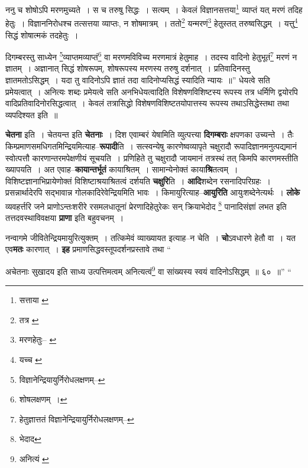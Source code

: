 \documentclass[article,12pt,a4paper]{memoir}
\begin{document}
	ननु च शोषोऽपि मरणमुच्यते । स च तरुषु सिद्धः । सत्यम् । केवलं विज्ञानसत्तया\footnote{सत्ताया \cite{dp-msA}} व्याप्तं यत् मरणं तदिह हेतुः । विज्ञाननिरोधश्च तत्सत्तया व्याप्तः, न शोषमात्रम् । ततो\footnote{तत्र \cite{dp-msA}} यन्मरणं\footnote{मरणहेतुः--\cite{dp-msA} \cite{dp-msB} \cite{dp-edP} \cite{dp-edH} \cite{dp-edN}} हेतुस्तत् तरुष्वसिद्धम् । यत्तु\footnote{यच्च \cite{dp-msD}} सिद्धं शोषात्मकं तदहेतुः । 
	  
	दिगम्बरस्तु साध्येन \footnote{विज्ञानेन्द्रियायुर्निरोधलक्षणम्--\cite{dp-msD-n}}व्याप्तमव्याप्तं\footnote{शोषलक्षणम् ।} वा मरणमविविच्य मरणमात्रं हेतुमाह । तदस्य वादिनो हेतुभूतं\footnote{हेतुज्ञात्ततं \cite{dp-msA} विज्ञानेन्द्रियायुर्निरोधलक्षणम्--\cite{dp-msD-n}} मरणं न ज्ञातम् । अज्ञानात् सिद्धं शोषरूपम्, शोषरूपस्य मरणस्य तरुषु दर्शनात् । प्रतिवादिनस्तु ज्ञातमतोऽसिद्धम् । यदा तु वादिनोऽपि ज्ञातं तदा वादिनोप्यसिद्धं स्यादिति न्यायः ॥” धेयत्वे सति प्रमेयत्वात् । अनित्यः शब्दः प्रमेयत्वे सति अनभिधेयत्वादिति विशेषणविशिष्टस्य रूपस्य तत्र धर्मिणि द्वयोरपि वादिप्रतिवादिनोरसिद्धत्वात् । केवलं तत्रासिद्धो विशेषणविशिष्टतयोपात्तस्य रूपस्य तथाऽसिद्धेस्तथा तथा व्यपदिश्यत इति ॥
	\pend
      

	  \pstart \textbf{चेतना} इति । चेतयन्त इति \textbf{चेतनाः} । दिश एवाम्बरं येषामिति व्युत्पत्त्या \textbf{दिगम्बराः} क्षपणका उच्यन्ते । तैः किम्प्रमाणसमधिगतमिन्द्रियमित्याह--\textbf{रूपादी}ति । सत्स्वन्येषु कारणेष्वव्यापृते चक्षुरादौ रूपादिज्ञानमनुत्पद्यमानं स्वोत्पत्तौ कारणा\leavevmode{}न्तरमपेक्षणीयं सूचयति । प्रणिहिते तु चक्षुरादौ जायमानं तत्रस्थं तत् किमपि कारणमस्तीति ख्यापयति । अत एवाह--\textbf{कायान्तर्भूतं} कायाश्रितम् । सामान्येनोक्तं काया\textbf{श्रि}तत्वम् । विशिष्टज्ञानाभिप्रायेणोक्तं विशिष्टाश्रयाश्रितत्वं दर्शयति \textbf{चक्षुरि}ति । \textbf{आदि}शब्देन रसनादिपरिग्रहः । प्रसन्नार्थादेरपि सद्भावान्न गोलकादिरेवेन्द्रियमिति भावः । किमायुरित्याह--\textbf{आयुरिति} आयुःशब्देनेत्यर्थः । \textbf{लोके} व्यवहर्त्तरि जने प्राणोऽन्तःशरीरे रसमलधातूनां प्रेरणादिहेतुरेकः सन् क्रियाभेदोद \footnote{भेदाद} पानादिसंज्ञां लभत इति तत्तदवस्थाविवक्षया \textbf{प्राणा} इति बहुवचनम् ।
	\pend
      

	  \pstart नन्वागमे जीवितेन्द्रियमायुरित्युक्तम् । तत्किमेवं व्याख्यायत इत्याह--न चेति । \textbf{चो}ऽवधारणे हेतौ वा । यत एव\textbf{मतः} कारणात् । \textbf{इह} प्रमाणसिद्धवस्तूपदर्शनप्रस्तावे तथा  \leavevmode{} “
	  
	अचेतनाः सुखादय इति साध्य उत्पत्तिमत्वम् अनित्यत्वं\footnote{अनित्यं \cite{dp-msB} \cite{dp-edP} \cite{dp-edH} \cite{dp-edE} \cite{dp-edN}} वा सांख्यस्य स्वयं वादिनोऽसिद्धम् ॥ ६० ॥” “
	  
\end{document}
